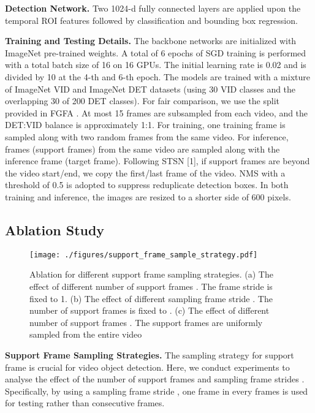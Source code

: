 \documentclass[letterpaper]{article} \usepackage{aaai21}  \usepackage{times}  \usepackage{helvet} \usepackage{courier}  \usepackage[hyphens]{url}  \usepackage{graphicx} \usepackage{hyperref}
\begin{document}
\noindent\textbf{Detection Network.}
Two 1024-d fully connected layers are applied upon the temporal ROI features followed by classification and bounding box regression.

\noindent\textbf{Training and Testing Details.}
The backbone networks are initialized with ImageNet pre-trained weights. A total of 6 epochs of SGD training is performed with a total batch size of 16 on 16 GPUs. The initial learning rate is 0.02 and is divided by 10 at the 4-th and 6-th epoch. The models are trained with a mixture of ImageNet VID and ImageNet DET datasets \cite{russakovsky2015imagenet} (using 30 VID classes and the overlapping 30 of 200 DET classes). For fair comparison, we use the split provided in FGFA \cite{zhu2017flow}. At most 15 frames are subsampled from each video, and the DET:VID balance is approximately 1:1. For training, one training frame is sampled along with two random frames from the same video. For inference,  frames (support frames) from the same video are sampled along with the inference frame (target frame). Following STSN [1], if support frames are beyond the video start/end, we copy the first/last frame of the video. NMS with a threshold of 0.5 is adopted to suppress reduplicate detection boxes. In both training and inference, the images are resized to a shorter side of 600 pixels.

\subsection{Ablation Study}
\label{exp_ablation}
\begin{figure}[t]
\centering
\texttt{[image: ./figures/support\_frame\_sample\_strategy.pdf]}
\caption{Ablation for different support frame sampling strategies. (a) The effect of different number of support frames . The frame stride  is fixed to 1. (b) The effect of different sampling frame stride . The number of support frames  is fixed to . (c) The effect of different number of support frames . The support frames  are uniformly  sampled from the entire video}
\label{fig:support_frame_sample_strategy}
\vspace{-0.25cm}
\end{figure}

\noindent\textbf{Support Frame Sampling Strategies.}
The sampling strategy for support frame is crucial for video object detection.
Here, we conduct experiments to analyse the effect of the number of support frames  and sampling frame strides .
Specifically, by using a sampling frame stride , one frame in every  frames is used for testing rather than consecutive frames.
\end{document}
